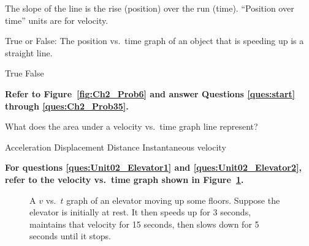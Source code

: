 \documentclass[answers]{exam}
\begin{document}
\begin{questions}
\begin{questions}
\begin{solution}
The slope of the line is the rise (position) over the run (time). ``Position over time'' units are for velocity.
\end{solution}


\question
True or False: The position vs.~time graph of an object that is speeding up is a straight line.

\begin{choices}
\choice True
\CorrectChoice False
\end{choices}



\begin{EnvUplevel}
\textbf{Refer to Figure~\ref{fig:Ch2_Prob6} and answer Questions \ref{ques:start} through \ref{ques:Ch2_Prob35}.}
\end{EnvUplevel}


\question
What does the area under a velocity vs.~time graph line represent?

\begin{choices}
\choice Acceleration
\CorrectChoice Displacement
\choice Distance
\choice Instantaneous velocity
\end{choices}

\begin{EnvUplevel}
\textbf{For questions \ref{ques:Unit02_Elevator1} and \ref{ques:Unit02_Elevator2}, refer to the velocity vs.~time graph shown in Figure~\ref{fig:Unit02_Fig2.20}.}
\end{EnvUplevel}

\begin{figure}[h!]
    \centering
    \caption{A $v$ vs.~$t$ graph of an elevator moving up some floors. Suppose the elevator is initially at rest. It then speeds up for 3 seconds, maintains that velocity for 15 seconds, then slows down for 5 seconds until it stops.}
    \label{fig:Unit02_Fig2.20}
\end{figure}


\end{questions}
\end{questions}
\end{document}
